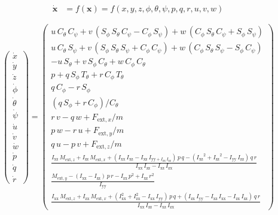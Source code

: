\documentclass{article}
\begin{document}
\begin{dmath}
\begin{aligned}
\bm{\dot{x}}&=f\left(\bm{x}\right)=f\left(x, y, z, \phi, \theta, \psi, p, q, r, u, v, w\right)
\end{aligned}
\end{dmath}

\begin{dmath}
\left(\begin{array}{c} \dot{x}\\ \dot{y}\\ \dot{z}\\ \dot{\phi }\\ \dot{\theta }\\ \dot{\psi }\\ \dot{u}\\ \dot{v}\\ \dot{w}\\ \dot{p}\\ \dot{q}\\ \dot{r} \end{array}\right)=\left(\begin{array}{c} u\,C_{\theta }\,C_{\psi } + v\,\left(S_{\phi }\,S_{\theta }\,C_{\psi }-C_{\phi }\,S_{\psi }\right) + w\,\left(C_{\phi }\,S_{\theta }\,C_{\psi } + S_{\phi }\,S_{\psi }\right)\\ u\,C_{\theta }\,S_{\psi } + v\,\left(S_{\phi }\,S_{\theta }\,S_{\psi }+C_{\phi }\,C_{\psi }\right)+w\,\left(C_{\phi }\,S_{\theta }\,S_{\psi }-S_{\phi }\,C_{\psi }\right)\\ -u\,S_{\theta }+v\,S_{\phi }\,C_{\theta }+w\,C_{\phi }\,C_{\theta } \\ p+q\,S_{\phi }\,T_{\theta }+r\,C_{\phi }\,T_{\theta }\\ q\,C_{\phi }-r\,S_{\phi }\\ \left(q\,S_{\phi }+r\,C_{\phi }\right)/C_{\theta } \\ r\,v-q\,w+F_{\mathrm{ext},x}/m\\ p\,w-r\,u+F_{\mathrm{ext},y}/m\\ q\,u-p\,v+F_{\mathrm{ext},z}/m \\ \frac{I_{\mathrm{xz}}\,M_{\mathrm{ext},z}+I_{\mathrm{zz}}\,M_{\mathrm{ext},x} + \left(I_{\mathrm{xx}}\,I_{\mathrm{xz}}-I_{\mathrm{xz}}\,I_{\mathrm{yy}+I_{\mathrm{zx}}\,I_{\mathrm{zz}}} \right)\,p\,q - \left({I_{\mathrm{xz}}}^2 + {I_{\mathrm{zz}}}^2 - I_{\mathrm{yy}}\,I_{\mathrm{zz}} \right)\,q\,r}{I_{\mathrm{xx}}\,I_{\mathrm{zz}}-I_{\mathrm{xz}}\,I_{\mathrm{zx}}} \\ \frac{M_{\mathrm{ext},y}- \left(I_{\mathrm{xx}}-I_{\mathrm{zz}}\right)\,p\,r-I_{\mathrm{zx}}\,p^2+I_{\mathrm{xz}}\,r^2}{I_{\mathrm{yy}}} \\ \frac{I_{\mathrm{xx}}\,M_{\mathrm{ext},z}+I_{\mathrm{zx}}\,M_{\mathrm{ext},x}+\left(I_{\mathrm{xx}}^2+I_{\mathrm{zx}}^2-I_{\mathrm{xx}}\,I_{\mathrm{yy}}\right)\,p\,q+\left(I_{\mathrm{zx}}\,I_{\mathrm{yy}}-I_{\mathrm{xz}}\,I_{\mathrm{xx}}-I_{\mathrm{zx}}\,I_{\mathrm{zz}}\right)\,q\,r}{I_{\mathrm{xx}}\,I_{\mathrm{zz}}-I_{\mathrm{xz}}\,I_{\mathrm{zx}}} \end{array}\right)
\end{dmath}
\end{document}
